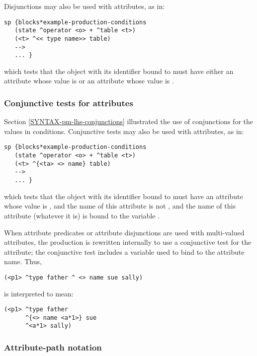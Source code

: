 Disjunctions may also be used with attributes, as in:

\begin{verbatim}
sp {blocks*example-production-conditions
   (state ^operator <o> + ^table <t>)
   (<t> ^<< type name>> table)
   -->
   ... }
\end{verbatim}

which tests that the object with its identifier bound to  must have either an attribute  whose value is  or an attribute  whose value is .

\subsubsection*{Conjunctive tests for attributes}

Section \ref{SYNTAX-pm-lhs-conjunctions} illustrated the use of conjunctions for the values in conditions. Conjunctive tests may also be used with attributes, as in:

\begin{verbatim}
sp {blocks*example-production-conditions
   (state ^operator <o> + ^table <t>)
   (<t> ^{<ta> <> name} table)
   -->
   ... }
\end{verbatim}

which tests that the object with its identifier bound to  must have an attribute whose value is , and the name of this attribute is not , and the name of this attribute (whatever it is) is bound to the variable .

When attribute predicates or attribute disjunctions are used with multi-valued attributes, the production is rewritten internally to use a conjunctive test for the attribute; the conjunctive test includes a variable used to bind to the attribute name. Thus,

\begin{verbatim}
(<p1> ^type father ^ <> name sue sally)
\end{verbatim}

is interpreted to mean:

\begin{verbatim}
(<p1> ^type father
      ^{<> name <a*1>} sue
      ^<a*1> sally)
\end{verbatim}


\subsubsection{Attribute-path notation}
\label{SYNTAX-pm-lhs-path}

